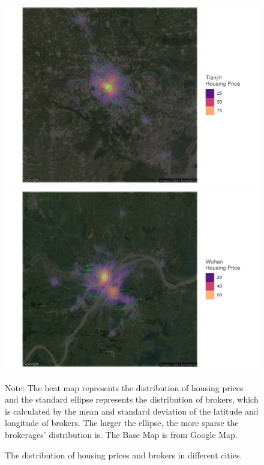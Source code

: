 \begin{figure}[h!]
\begin{scriptsize}
\begin{minipage}{0.328\textwidth}
        \includegraphics[width=\linewidth]{../figures/distribution_of_hp_and_broker/Tianjin.pdf}
    \end{minipage}

    \begin{minipage}{0.328\textwidth}
        \includegraphics[width=\linewidth]{../figures/distribution_of_hp_and_broker/Wuhan.pdf}
    \end{minipage}
    \hfill

\caption{The distribution of housing prices and brokers in different cities.}

Note: The heat map represents the distribution of housing prices and the standard ellipse represents the distribution of brokers, which is calculated by the mean and standard deviation of the latitude and longitude of brokers. The larger the ellipse, the more sparse the brokerages' distribution is. The Base Map is from Google Map.\end{scriptsize} \end{figure}
